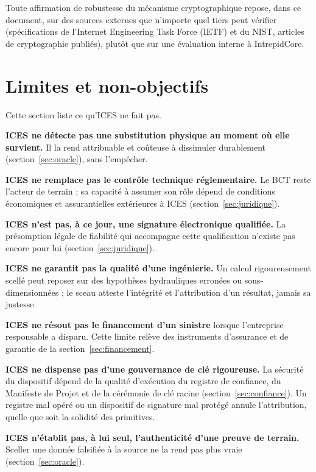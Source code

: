 \documentclass[11pt,a4paper]{article}
\begin{document}
Toute affirmation de robustesse du mécanisme cryptographique repose, dans ce document, sur des sources externes que n'importe quel tiers peut vérifier (spécifications de l'Internet Engineering Task Force (IETF) et du NIST, articles de cryptographie publiés), plutôt que sur une évaluation interne à IntrepidCore.

\section{Limites et non-objectifs}\label{sec:limites}

Cette section liste ce qu'ICES ne fait pas.

\textbf{ICES ne détecte pas une substitution physique au moment où elle survient.} Il la rend attribuable et coûteuse à dissimuler durablement (section~\ref{sec:oracle}), sans l'empêcher.

\textbf{ICES ne remplace pas le contrôle technique réglementaire.} Le BCT reste l'acteur de terrain ; sa capacité à assumer son rôle dépend de conditions économiques et assurantielles extérieures à ICES (section~\ref{sec:juridique}).

\textbf{ICES n'est pas, à ce jour, une signature électronique qualifiée.} La présomption légale de fiabilité qui accompagne cette qualification n'existe pas encore pour lui (section~\ref{sec:juridique}).

\textbf{ICES ne garantit pas la qualité d'une ingénierie.} Un calcul rigoureusement scellé peut reposer sur des hypothèses hydrauliques erronées ou sous-dimensionnées ; le sceau atteste l'intégrité et l'attribution d'un résultat, jamais sa justesse.

\textbf{ICES ne résout pas le financement d'un sinistre} lorsque l'entreprise responsable a disparu. Cette limite relève des instruments d'assurance et de garantie de la section~\ref{sec:financement}.

\textbf{ICES ne dispense pas d'une gouvernance de clé rigoureuse.} La sécurité du dispositif dépend de la qualité d'exécution du registre de confiance, du Manifeste de Projet et de la cérémonie de clé racine (section~\ref{sec:confiance}). Un registre mal opéré ou un dispositif de signature mal protégé annule l'attribution, quelle que soit la solidité des primitives.

\textbf{ICES n'établit pas, à lui seul, l'authenticité d'une preuve de terrain.} Sceller une donnée falsifiée à la source ne la rend pas plus vraie (section~\ref{sec:oracle}).
\end{document}
